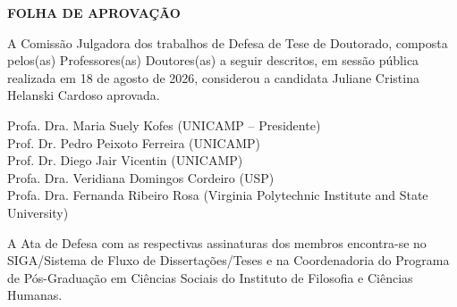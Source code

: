 
\thispagestyle{empty}

\begin{center}
  {\Large \textbf{FOLHA DE APROVAÇÃO}}
\end{center}

\vspace{2cm}

\noindent A Comissão Julgadora dos trabalhos de Defesa de Tese de Doutorado, composta pelos(as) Professores(as) Doutores(as) a seguir descritos, em sessão pública realizada em 18 de agosto de 2026, considerou a candidata Juliane Cristina Helanski Cardoso aprovada.

\vspace{1.5cm}

\begin{center}
  Profa. Dra. Maria Suely Kofes (UNICAMP -- Presidente)\\[0.7cm]
  Prof. Dr. Pedro Peixoto Ferreira (UNICAMP)\\[0.7cm]
  Prof. Dr. Diego Jair Vicentin (UNICAMP)\\[0.7cm]
  Profa. Dra. Veridiana Domingos Cordeiro (USP)\\[0.7cm]
  Profa. Dra. Fernanda Ribeiro Rosa (Virginia Polytechnic Institute and State University)
\end{center}

\vspace{1.5cm}

\noindent A Ata de Defesa com as respectivas assinaturas dos membros encontra-se no SIGA/Sistema de Fluxo de Dissertações/Teses e na Coordenadoria do Programa de Pós-Graduação em Ciências Sociais do Instituto de Filosofia e Ciências Humanas.

\clearpage